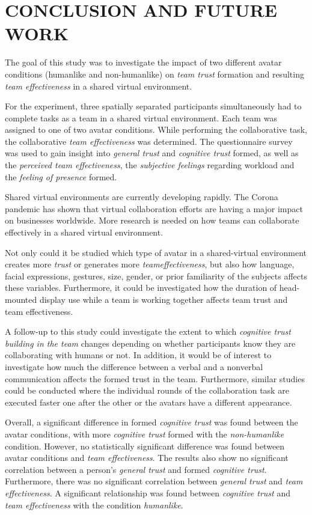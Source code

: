 \documentclass[sigchi]{acmart}
\begin{document}
\section{CONCLUSION AND FUTURE WORK}
The goal of this study was to investigate the impact of two different avatar conditions (humanlike and non-humanlike) on \textit{team trust} formation and resulting \textit{team effectiveness} in a shared virtual environment. 

For the experiment, three spatially separated participants simultaneously had to complete tasks as a team in a shared virtual environment. Each team was assigned to one of two avatar conditions. While performing the collaborative task, the collaborative \textit{team effectiveness} was determined. The questionnaire survey was used to gain insight into \textit{general trust} and \textit{cognitive trust} formed, as well as the \textit{perceived team effectiveness}, the \textit{subjective feelings} regarding workload and the \textit{feeling of presence} formed.

Shared virtual environments are currently developing rapidly. The Corona pandemic has shown that virtual collaboration efforts are having a major impact on businesses worldwide. More research is needed on how teams can collaborate effectively in a shared virtual environment.

Not only could it be studied which type of avatar in a shared-virtual environment creates more \textit{trust} or generates more \textit{teameffectiveness}, but also how language, facial expressions, gestures, size, gender, or prior familiarity of the subjects affects these variables.
Furthermore, it could be investigated how the duration of head-mounted display use while a team is working together affects team trust and team effectiveness.

A follow-up to this study could investigate the extent to which \textit{cognitive trust building in the team} changes depending on whether participants know they are collaborating with humans or not. In addition, it would be of interest to investigate how much the difference between a verbal and a nonverbal communication affects the formed trust in the team.  
Furthermore, similar studies could be conducted where the individual rounds of the collaboration task are executed faster one after the other or the avatars have a different appearance.

Overall, a significant difference in formed \textit{cognitive trust} was found between the avatar conditions, with more \textit{cognitive trust} formed with the \textit{non-humanlike} condition. However, no statistically significant difference was found between avatar conditions and \textit{team effectiveness}. The results also show no significant correlation between a person's \textit{general trust} and formed \textit{cognitive trust}. Furthermore, there was no significant correlation between \textit{general trust} and \textit{team effectiveness}. A significant relationship was found between \textit{cognitive trust} and \textit{team effectiveness} with the condition \textit{humanlike}.
\end{document}
